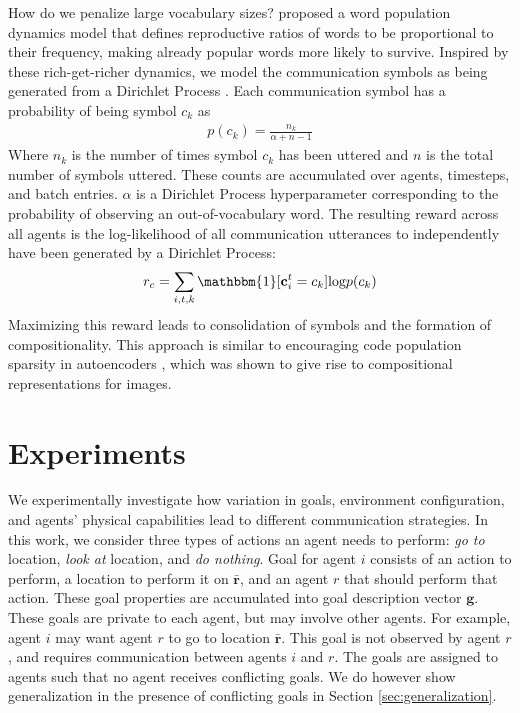 \documentclass[letterpaper]{article} %
\begin{document}
How do we penalize large vocabulary sizes?  \cite{nowak00syntax} proposed a word population dynamics model that defines reproductive ratios of words to be proportional to their frequency, making already popular words more likely to survive. Inspired by these rich-get-richer dynamics, we model the communication symbols as being generated from a Dirichlet Process \cite{teh11dirichlet}. Each communication symbol has a probability of being symbol $c_k$ as
\begin{align*}
    p(c_k) = \frac{ n_k }{\alpha + n - 1}
\end{align*}
Where $n_k$ is the number of times symbol $c_k$ has been uttered and $n$ is the total number of symbols uttered. These counts are accumulated over agents, timesteps, and batch entries. $\alpha$ is a Dirichlet Process hyperparameter corresponding to the probability of observing an out-of-vocabulary word. The resulting reward across all agents is the log-likelihood of all communication utterances to independently have been generated by a Dirichlet Process:
\begin{align*}
    r_c = \sum_{i,t,k} \mathbbm{1}[\mathbf{c}^t_i = c_k] \text{log} p(c_k)
\end{align*}
Maximizing this reward leads to consolidation of symbols and the formation of compositionality. This approach is similar to encouraging code population sparsity in autoencoders \cite{ng11}, which was shown to give rise to compositional representations for images.

\section{Experiments}
\label{sec:experiments}

We experimentally investigate how variation in goals, environment configuration, and agents’ physical capabilities lead to different communication strategies. In this work, we consider three types of actions an agent needs to perform: \emph{go to} location, \emph{look at} location, and \emph{do nothing}. Goal for agent $i$ consists of an action to perform, a location to perform it on $\bar{\mathbf{r}}$, and an agent $r$ that should perform that action. These goal properties are accumulated into goal description vector $\mathbf{g}$. These goals are private to each agent, but may involve other agents. For example, agent $i$ may want agent $r$ to go to location $\bar{\mathbf{r}}$. This goal is not observed by agent $r$, and requires communication between agents $i$ and $r$. The goals are assigned to agents such that no agent receives conflicting goals. We do however show generalization in the presence of conflicting goals in Section \ref{sec:generalization}.
\end{document}
